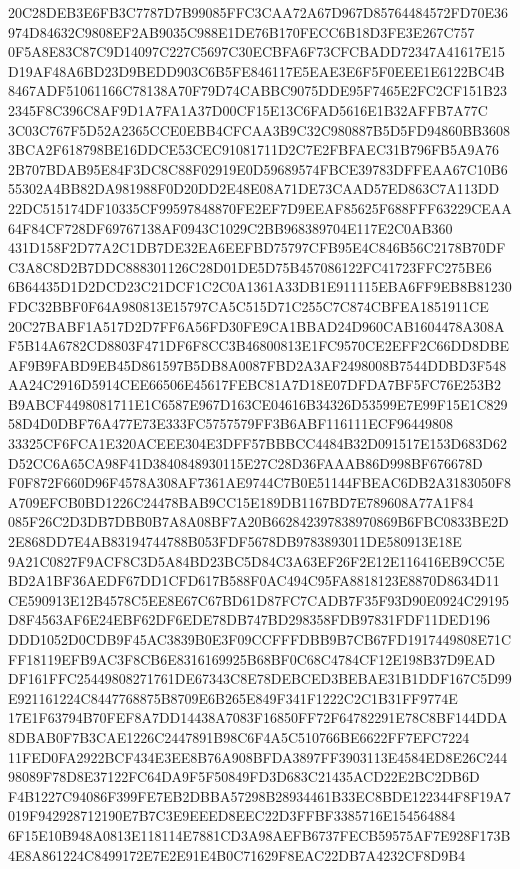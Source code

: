 \documentclass[UTF8,fontset=fandol,zihao=-4,a4paper]{ctexart}
\begin{document}
{{20C28DEB3E6FB3C7787D7B99085FFC3CAA72A67D967D85764484572FD70E36974D84632C9808EF2AB9035C988E1DE76B170FECC6B18D3FE3E267C757
0F5A8E83C87C9D14097C227C5697C30ECBFA6F73CFCBADD72347A41617E15D19AF48A6BD23D9BEDD903C6B5FE846117E5EAE3E6F5F0EEE1E6122BC4B
8467ADF51061166C78138A70F79D74CABBC9075DDE95F7465E2FC2CF151B232345F8C396C8AF9D1A7FA1A37D00CF15E13C6FAD5616E1B32AFFB7A77C
3C03C767F5D52A2365CCE0EBB4CFCAA3B9C32C980887B5D5FD94860BB36083BCA2F618798BE16DDCE53CEC91081711D2C7E2FBFAEC31B796FB5A9A76
2B707BDAB95E84F3DC8C88F02919E0D59689574FBCE39783DFFEAA67C10B655302A4BB82DA981988F0D20DD2E48E08A71DE73CAAD57ED863C7A113DD
22DC515174DF10335CF99597848870FE2EF7D9EEAF85625F688FFF63229CEAA64F84CF728DF69767138AF0943C1029C2BB968389704E117E2C0AB360
431D158F2D77A2C1DB7DE32EA6EEFBD75797CFB95E4C846B56C2178B70DFC3A8C8D2B7DDC888301126C28D01DE5D75B457086122FC41723FFC275BE6
6B64435D1D2DCD23C21DCF1C2C0A1361A33DB1E911115EBA6FF9EB8B81230FDC32BBF0F64A980813E15797CA5C515D71C255C7C874CBFEA1851911CE
20C27BABF1A517D2D7FF6A56FD30FE9CA1BBAD24D960CAB1604478A308AF5B14A6782CD8803F471DF6F8CC3B46800813E1FC9570CE2EFF2C66DD8DBE
AF9B9FABD9EB45D861597B5DB8A0087FBD2A3AF2498008B7544DDBD3F548AA24C2916D5914CEE66506E45617FEBC81A7D18E07DFDA7BF5FC76E253B2
B9ABCF4498081711E1C6587E967D163CE04616B34326D53599E7E99F15E1C82958D4D0DBF76A477E73E333FC5757579FF3B6ABF116111ECF96449808
33325CF6FCA1E320ACEEE304E3DFF57BBBCC4484B32D091517E153D683D62D52CC6A65CA98F41D3840848930115E27C28D36FAAAB86D998BF676678D
F0F872F660D96F4578A308AF7361AE9744C7B0E51144FBEAC6DB2A3183050F8A709EFCB0BD1226C24478BAB9CC15E189DB1167BD7E789608A77A1F84
085F26C2D3DB7DBB0B7A8A08BF7A20B662842397838970869B6FBC0833BE2D2E868DD7E4AB83194744788B053FDF5678DB9783893011DE580913E18E
9A21C0827F9ACF8C3D5A84BD23BC5D84C3A63EF26F2E12E116416EB9CC5EBD2A1BF36AEDF67DD1CFD617B588F0AC494C95FA8818123E8870D8634D11
CE590913E12B4578C5EE8E67C67BD61D87FC7CADB7F35F93D90E0924C29195D8F4563AF6E24EBF62DF6EDE78DB747BD298358FDB97831FDF11DED196
DDD1052D0CDB9F45AC3839B0E3F09CCFFFDBB9B7CB67FD1917449808E71CFF18119EFB9AC3F8CB6E8316169925B68BF0C68C4784CF12E198B37D9EAD
DF161FFC25449808271761DE67343C8E78DEBCED3BEBAE31B1DDF167C5D99E921161224C8447768875B8709E6B265E849F341F1222C2C1B31FF9774E
17E1F63794B70FEF8A7DD14438A7083F16850FF72F64782291E78C8BF144DDA8DBAB0F7B3CAE1226C2447891B98C6F4A5C510766BE6622FF7EFC7224
11FED0FA2922BCF434E3EE8B76A908BFDA3897FF3903113E4584ED8E26C24498089F78D8E37122FC64DA9F5F50849FD3D683C21435ACD22E2BC2DB6D
F4B1227C94086F399FE7EB2DBBA57298B28934461B33EC8BDE122344F8F19A7019F942928712190E7B7C3E9EEED8EEC22D3FFBF3385716E154564884
6F15E10B948A0813E118114E7881CD3A98AEFB6737FECB59575AF7E928F173B4E8A861224C8499172E7E2E91E4B0C71629F8EAC22DB7A4232CF8D9B4
}}
\end{document}
